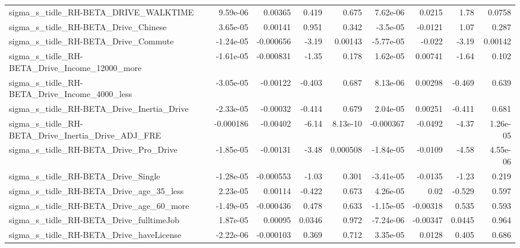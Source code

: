 \begin{tabular}{lrrrrrrrr}
sigma\_s\_tidle\_RH-BETA\_DRIVE\_WALKTIME               &    9.59e-06 &      0.00365 &    0.419 &    0.675 &   7.62e-06 &      0.0215 &         1.78 &        0.0758 \\
sigma\_s\_tidle\_RH-BETA\_Drive\_Chinese                &    3.65e-05 &      0.00141 &    0.951 &    0.342 &   -3.5e-05 &     -0.0121 &         1.07 &         0.287 \\
sigma\_s\_tidle\_RH-BETA\_Drive\_Commute                &   -1.24e-05 &    -0.000656 &    -3.19 &  0.00143 &  -5.77e-05 &      -0.022 &        -3.19 &       0.00142 \\
sigma\_s\_tidle\_RH-BETA\_Drive\_Income\_12000\_more      &   -1.61e-05 &    -0.000831 &    -1.35 &    0.178 &   1.62e-05 &     0.00741 &        -1.64 &         0.102 \\
sigma\_s\_tidle\_RH-BETA\_Drive\_Income\_4000\_less       &   -3.05e-05 &     -0.00122 &   -0.403 &    0.687 &   8.13e-06 &     0.00298 &       -0.469 &         0.639 \\
sigma\_s\_tidle\_RH-BETA\_Drive\_Inertia\_Drive          &   -2.33e-05 &     -0.00032 &   -0.414 &    0.679 &   2.04e-05 &     0.00251 &       -0.411 &         0.681 \\
sigma\_s\_tidle\_RH-BETA\_Drive\_Inertia\_Drive\_ADJ\_FRE  &   -0.000186 &     -0.00402 &    -6.14 & 8.13e-10 &  -0.000367 &     -0.0492 &        -4.37 &      1.26e-05 \\
sigma\_s\_tidle\_RH-BETA\_Drive\_Pro\_Drive              &   -1.85e-05 &     -0.00131 &    -3.48 & 0.000508 &  -1.84e-05 &     -0.0109 &        -4.58 &      4.55e-06 \\
sigma\_s\_tidle\_RH-BETA\_Drive\_Single                 &   -1.28e-05 &    -0.000553 &    -1.03 &    0.301 &  -3.41e-05 &     -0.0135 &        -1.23 &         0.219 \\
sigma\_s\_tidle\_RH-BETA\_Drive\_age\_35\_less            &    2.23e-05 &      0.00114 &   -0.422 &    0.673 &   4.26e-05 &        0.02 &       -0.529 &         0.597 \\
sigma\_s\_tidle\_RH-BETA\_Drive\_age\_60\_more            &   -1.49e-05 &    -0.000436 &    0.478 &    0.633 &  -1.15e-05 &    -0.00318 &        0.535 &         0.593 \\
sigma\_s\_tidle\_RH-BETA\_Drive\_fulltimeJob            &    1.87e-05 &      0.00095 &   0.0346 &    0.972 &  -7.24e-06 &    -0.00347 &       0.0445 &         0.964 \\
sigma\_s\_tidle\_RH-BETA\_Drive\_haveLicense            &   -2.22e-06 &    -0.000103 &    0.369 &    0.712 &   3.35e-05 &      0.0128 &        0.405 &         0.686 \\

\end{tabular}
